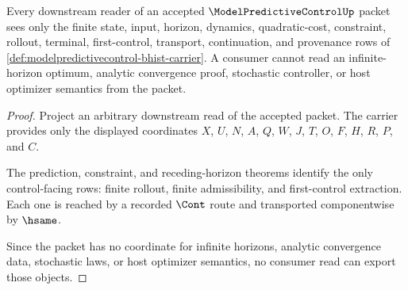 \begin{theorem}
\label{thm:modelpredictivecontrol-consumer-boundary}
Every downstream reader of an accepted $\ModelPredictiveControlUp$ packet sees
only the finite state, input, horizon, dynamics, quadratic-cost, constraint,
rollout, terminal, first-control, transport, continuation, and provenance rows
of \autoref{def:modelpredictivecontrol-bhist-carrier}. A consumer cannot read
an infinite-horizon optimum, analytic convergence proof, stochastic controller,
or host optimizer semantics from the packet.
\end{theorem}
\begin{proof}
Project an arbitrary downstream read of the accepted packet. The carrier
provides only the displayed coordinates $X$, $U$, $N$, $A$, $Q$, $W$, $J$,
$T$, $O$, $F$, $H$, $R$, $P$, and $C$.

The prediction, constraint, and receding-horizon theorems identify the only
control-facing rows: finite rollout, finite admissibility, and first-control
extraction. Each one is reached by a recorded $\Cont$ route and transported
componentwise by $\hsame$.

Since the packet has no coordinate for infinite horizons, analytic convergence
data, stochastic laws, or host optimizer semantics, no consumer read can export
those objects.
\end{proof}

